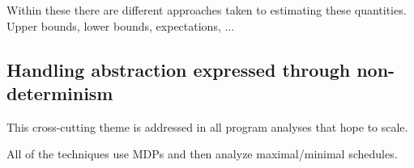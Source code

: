 
Within these there are different approaches taken to estimating
these quantities.  Upper bounds, lower bounds, expectations, ...

\subsection{Handling abstraction expressed through non-determinism}
This cross-cutting theme is addressed in all program analyses that
hope to scale. 

All of the techniques use MDPs and then analyze maximal/minimal
schedules.


